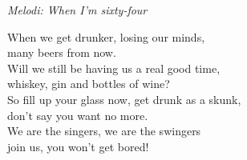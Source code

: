 {\footnotesize\textit{Melodi: When I'm sixty-four}}\par
\vspace{10pt}
When we get drunker, losing our minds,\\
many beers from now.\\
Will we still be having us a real good time,\\
whiskey, gin and bottles of wine?\\
So fill up your glass now, get drunk as a skunk,\\
don't say you want no more.\\
We are the singers, we are the swingers\\
join us, you won't get bored!

